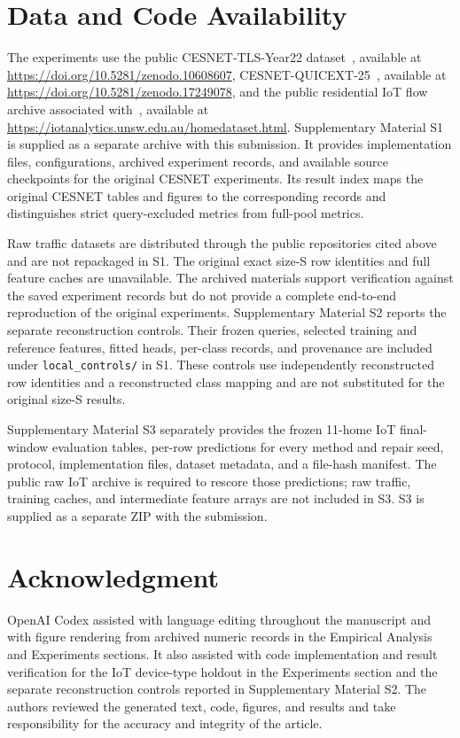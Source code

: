 \documentclass[journal]{IEEEtran}
\begin{document}
\section*{Data and Code Availability}
The experiments use the public CESNET-TLS-Year22 dataset~\cite{hynek2024cesnet}, available at \url{https://doi.org/10.5281/zenodo.10608607}, CESNET-QUICEXT-25~\cite{cesnetquicext25,mucke2025waiting}, available at \url{https://doi.org/10.5281/zenodo.17249078}, and the public residential IoT flow archive associated with~\cite{pashamokhtari2023dynamic}, available at \url{https://iotanalytics.unsw.edu.au/homedataset.html}. Supplementary Material S1 is supplied as a separate archive with this submission. It provides implementation files, configurations, archived experiment records, and available source checkpoints for the original CESNET experiments. Its result index maps the original CESNET tables and figures to the corresponding records and distinguishes strict query-excluded metrics from full-pool metrics.

Raw traffic datasets are distributed through the public repositories cited above and are not repackaged in S1. The original exact size-S row identities and full feature caches are unavailable. The archived materials support verification against the saved experiment records but do not provide a complete end-to-end reproduction of the original experiments. Supplementary Material S2 reports the separate reconstruction controls. Their frozen queries, selected training and reference features, fitted heads, per-class records, and provenance are included under \texttt{local\_controls/} in S1. These controls use independently reconstructed row identities and a reconstructed class mapping and are not substituted for the original size-S results.

Supplementary Material S3 separately provides the frozen 11-home IoT final-window evaluation tables, per-row predictions for every method and repair seed, protocol, implementation files, dataset metadata, and a file-hash manifest. The public raw IoT archive is required to rescore those predictions; raw traffic, training caches, and intermediate feature arrays are not included in S3. S3 is supplied as a separate ZIP with the submission.

\section*{Acknowledgment}
OpenAI Codex assisted with language editing throughout the manuscript and with figure rendering from archived numeric records in the Empirical Analysis and Experiments sections. It also assisted with code implementation and result verification for the IoT device-type holdout in the Experiments section and the separate reconstruction controls reported in Supplementary Material S2. The authors reviewed the generated text, code, figures, and results and take responsibility for the accuracy and integrity of the article.



\end{document}
